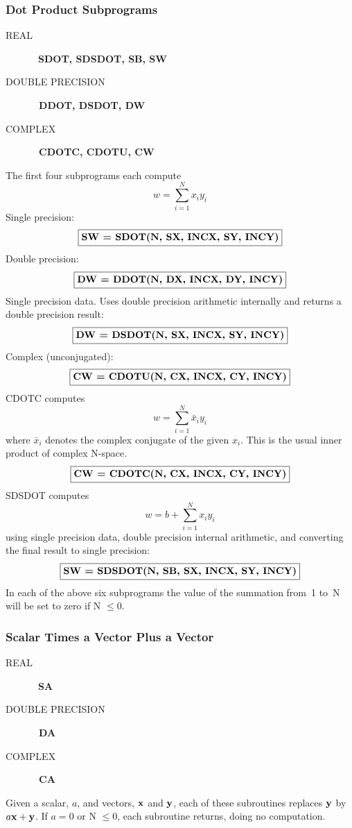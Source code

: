 \documentclass[twoside]{MATH77}
\begin{document}
\subsubsection{Dot Product Subprograms\label{B2}}
\begin{description}
\item[REAL]  \ {\bf SDOT, SDSDOT, SB, SW }

\item[DOUBLE PRECISION]  {\bf \ DDOT, DSDOT, DW }

\item[COMPLEX]  {\bf \ CDOTC, CDOTU, CW }
\end{description}
The first four subprograms each compute
\begin{equation*}
w=\sum_{i=1}^Nx_iy_i
\end{equation*}
Single precision:
$$
\fbox{{\bf SW = SDOT(N, SX, INCX, SY, INCY)}}
$$
Double precision:
$$
\fbox{{\bf DW = DDOT(N, DX, INCX, DY, INCY)}}
$$
Single precision data. Uses double precision arithmetic internally and
returns a double precision result:
$$
\fbox{{\bf DW = DSDOT(N, SX, INCX, SY, INCY)}}
$$
Complex (unconjugated):
$$
\fbox{{\bf CW = CDOTU(N, CX, INCX, CY, INCY)}}
$$
CDOTC computes%
\begin{equation*}
w=\sum_{i=1}^N\bar x_iy_i
\end{equation*}
where $\bar x_i$ denotes the complex conjugate of the given $x_i$. This is
the usual inner product of complex N-space.
$$
\fbox{{\bf CW = CDOTC(N, CX, INCX, CY, INCY)}}
$$
SDSDOT computes%
\begin{equation*}
w=b+\sum_{i=1}^Nx_iy_i
\end{equation*}
using single precision data, double precision internal arithmetic, and
converting the final result to single precision:
$$
\fbox{{\bf SW = SDSDOT(N, SB, SX, INCX, SY, INCY)}}
$$
In each of the above six subprograms the value of the summation from~1 to~N
will be set to zero if N $\leq 0.$

\subsubsection{Scalar Times a Vector Plus a Vector\label{B3}}
\begin{description}
\item[REAL]  \ {\bf SA }

\item[DOUBLE PRECISION]  {\bf \ DA }

\item[COMPLEX]  {\bf \ CA }
\end{description}
Given a scalar, $a$, and vectors, ${\bf x}$ and ${\bf y}$, each of these
subroutines replaces ${\bf y}$ by $a{\bf x} + {\bf y}$. If $a = 0$ or N $%
\leq 0$, each subroutine returns, doing no computation.
\end{document}
